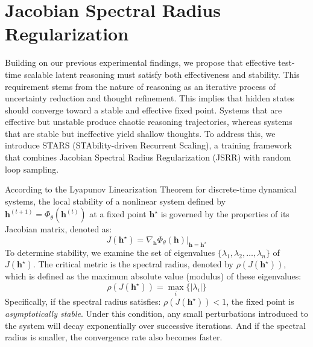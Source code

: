 
\section{Jacobian Spectral Radius Regularization}
Building on our previous experimental findings, we propose that effective test-time scalable latent reasoning must satisfy both effectiveness and stability. This requirement stems from the nature of reasoning as an iterative process of uncertainty reduction and thought refinement. This implies that hidden states should converge toward a stable and effective fixed point. Systems that are effective but unstable produce chaotic reasoning trajectories, whereas systems that are stable but ineffective yield shallow thoughts. To address this, we introduce STARS (STAbility-driven Recurrent Scaling), a training framework that combines Jacobian Spectral Radius Regularization (JSRR) with random loop sampling.

According to the Lyapunov Linearization Theorem for discrete-time dynamical systems, the local stability of a nonlinear system defined by $\mathbf{h}^{(t+1)} = \Phi_\theta(\mathbf{h}^{(t)})$ at a fixed point $\mathbf{h}^\star$ is governed by the properties of its Jacobian matrix, denoted as:$$J(\mathbf{h}^\star) = \left. \nabla_{\mathbf{h}} \Phi_\theta(\mathbf{h}) \right|_{\mathbf{h}=\mathbf{h}^\star}$$To determine stability, we examine the set of eigenvalues $\{\lambda_1, \lambda_2, \dots, \lambda_n\}$ of $J(\mathbf{h}^\star)$. The critical metric is the spectral radius, denoted by $\rho(J(\mathbf{h}^\star))$, which is defined as the maximum absolute value (modulus) of these eigenvalues:$$\rho(J(\mathbf{h}^\star)) = \max_{i} \{ |\lambda_i| \}$$Specifically, if the spectral radius satisfies: $\rho(J(\mathbf{h}^\star)) < 1$, the fixed point is \textit{asymptotically stable}. Under this condition, any small perturbations introduced to the system will decay exponentially over successive iterations. 
And if the spectral radius is smaller, the convergence rate also becomes faster.

